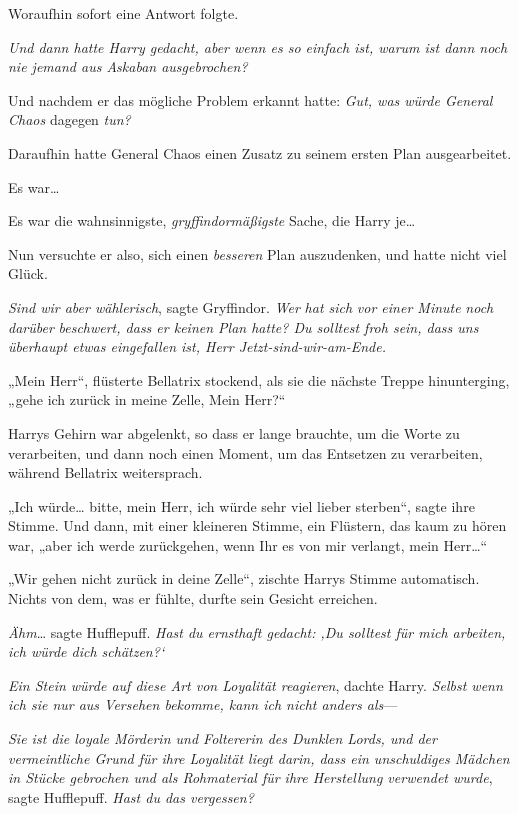 {Woraufhin sofort eine Antwort folgte.

\emph{Und dann hatte Harry gedacht, \emph{aber wenn es} so \emph{einfach ist, warum ist} \emph{dann} \emph{noch nie jemand aus Askaban ausgebrochen?}}

Und nachdem er das mögliche Problem erkannt hatte: \emph{Gut, was würde General Chaos} dagegen \emph{tun?}

Daraufhin hatte General Chaos einen Zusatz zu seinem ersten Plan ausgearbeitet.

Es war…

Es war die wahnsinnigste, \emph{gryffindormäßigste} Sache, die Harry je…

Nun versuchte er also, sich einen \emph{besseren} Plan auszudenken, und hatte nicht viel Glück.

\emph{Sind wir aber wählerisch}, sagte Gryffindor. \emph{Wer} \emph{hat sich} \emph{vor einer Minute} \emph{noch} \emph{darüber} \emph{beschwert, dass er keinen Plan hatte? Du solltest froh sein, dass uns überhaupt etwas eingefallen ist, Herr Jetzt-sind-wir-am-Ende.}

„Mein Herr“, flüsterte Bellatrix stockend, als sie die nächste Treppe hinunterging, „gehe ich zurück in meine Zelle, Mein Herr?“

Harrys Gehirn war abgelenkt, so dass er lange brauchte, um die Worte zu verarbeiten, und dann noch einen Moment, um das Entsetzen zu verarbeiten, während Bellatrix weitersprach.

„Ich würde… bitte, mein Herr, ich würde sehr viel lieber sterben“, sagte ihre Stimme. Und dann, mit einer kleineren Stimme, ein Flüstern, das kaum zu hören war, „aber ich werde zurückgehen, wenn Ihr es von mir verlangt, mein Herr…“

„Wir gehen nicht zurück in deine Zelle“, zischte Harrys Stimme automatisch. Nichts von dem, was er fühlte, durfte sein Gesicht erreichen.

\emph{Ähm}… sagte Hufflepuff. \emph{Hast du ernsthaft gedacht: ‚Du solltest für mich arbeiten, ich würde dich schätzen?`}

\emph{Ein Stein würde auf diese Art von Loyalität reagieren}, dachte Harry. \emph{Selbst wenn ich sie nur aus Versehen bekomme, kann ich nicht anders als}—

\emph{Sie ist die loyale Mörderin und Foltererin des Dunklen Lords, und der vermeintliche Grund für ihre Loyalität liegt darin, dass ein unschuldiges Mädchen in Stücke gebrochen und als Rohmaterial für ihre Herstellung verwendet wurde}, sagte Hufflepuff. \emph{Hast du das vergessen?}

}
